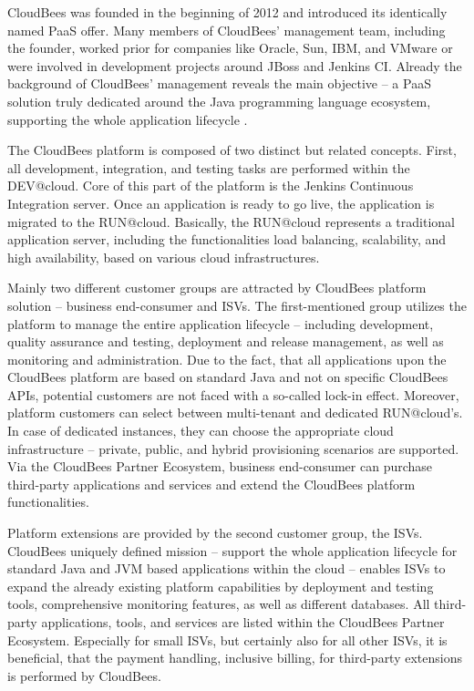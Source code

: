 CloudBees was founded in the beginning of 2012 and introduced its identically named \ac{PaaS} offer. Many members of CloudBees' management team, including the founder, worked prior for companies like Oracle, Sun, IBM, and VMware or were involved in development projects around JBoss and Jenkins CI. Already the background of CloudBees' management reveals the main objective -- a \ac{PaaS} solution truly dedicated around the Java programming language ecosystem, supporting the whole application lifecycle \citep{CloudBees2013}.

The CloudBees platform is composed of two distinct but related concepts. First, all development, integration, and testing tasks are performed within the DEV@cloud. Core of this part of the platform is the Jenkins Continuous Integration server. Once an application is ready to go live, the application is migrated to the RUN@cloud. Basically, the RUN@cloud represents a traditional application server, including the functionalities load balancing, scalability, and high availability, based on various cloud infrastructures.

Mainly two different customer groups are attracted by CloudBees platform solution -- business end-consumer and \acp{ISV}. The first-mentioned group utilizes the platform to manage the entire application lifecycle -- including development, quality assurance and testing, deployment and release management, as well as monitoring and administration. Due to the fact, that all applications upon the CloudBees platform are based on standard Java and not on specific CloudBees \acp{API}, potential customers are not faced with a so-called lock-in effect. Moreover, platform customers can select between multi-tenant and dedicated RUN@cloud's. In case of dedicated instances, they can choose the appropriate cloud infrastructure -- private, public, and hybrid provisioning scenarios are supported. Via the CloudBees Partner Ecosystem, business end-consumer can purchase third-party applications and services and extend the CloudBees platform functionalities. 

Platform extensions are provided by the second customer group, the \acp{ISV}. CloudBees uniquely defined mission -- support the whole application lifecycle for standard Java and \ac{JVM} based applications within the cloud -- enables \acp{ISV} to expand the already existing platform capabilities by deployment and testing tools, comprehensive monitoring features, as well as different databases. All third-party applications, tools, and services are listed within the CloudBees Partner Ecosystem. Especially for small \acp{ISV}, but certainly also for all other \acp{ISV}, it is beneficial, that the payment handling, inclusive billing, for third-party extensions is performed by CloudBees.

